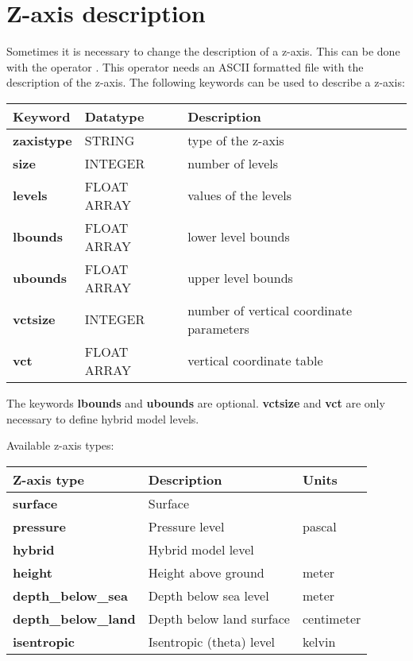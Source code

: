 \section{Z-axis description}

Sometimes it is necessary to change the description of a z-axis.
This can be done with the operator .
This operator needs an ASCII formatted file with the description
of the z-axis.
The following keywords can be used to describe a z-axis:

\vspace{3mm}
\begin{tabular}[b]{lll}
Keyword          & Datatype     & Description \\ \hline
{\bf zaxistype}  & STRING       & type of the z-axis   \\
{\bf size}       & INTEGER      & number of levels     \\
{\bf levels}     & FLOAT ARRAY  & values of the levels \\
{\bf lbounds}    & FLOAT ARRAY  & lower level bounds \\
{\bf ubounds}    & FLOAT ARRAY  & upper level bounds \\
{\bf vctsize}    & INTEGER      & number of vertical coordinate parameters \\
{\bf vct}        & FLOAT ARRAY  & vertical coordinate table \\
\end{tabular}
\vspace{3mm}

The keywords {\bf lbounds} and {\bf ubounds} are optional. {\bf vctsize} and {\bf vct} are only
necessary to define hybrid model levels.


Available z-axis types:

\vspace{3mm}
\begin{tabular}[b]{lll}
Z-axis type              & Description              &  Units        \\ \hline   
{\bf surface}            & Surface                  &               \\
{\bf pressure}           & Pressure level           &  pascal       \\
{\bf hybrid}             & Hybrid model level       &               \\
{\bf height}             & Height above ground      &  meter        \\
{\bf depth\_below\_sea}  & Depth below sea level    &  meter        \\
{\bf depth\_below\_land} & Depth below land surface &  centimeter   \\
{\bf isentropic}         & Isentropic (theta) level &  kelvin       \\
\end{tabular}
\vspace{3mm}

